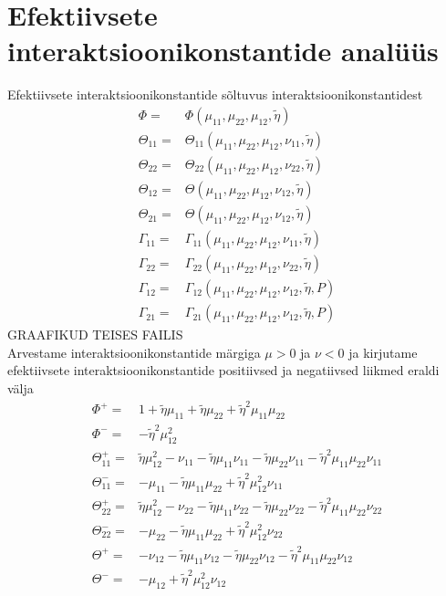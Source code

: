 \documentclass[class=article, crop=false]{standalone}
\begin{document}
\section{Efektiivsete interaktsioonikonstantide analüüs}
Efektiivsete interaktsioonikonstantide sõltuvus interaktsioonikonstantidest
\begin{equation}\label{key}
	\begin{split}
		\Phi = & \Phi ( \mu_{11}, \mu_{22}, \mu_{12}, \tilde{ \eta}) \\
		\Theta_{11} = & \Theta_{11} ( \mu_{11}, \mu_{22}, \mu_{12}, \nu_{11}, \tilde{ \eta}) \\
		\Theta_{22} = & \Theta_{22} ( \mu_{11}, \mu_{22}, \mu_{12}, \nu_{22}, \tilde{ \eta}) \\
		\Theta_{12} = & \Theta ( \mu_{11}, \mu_{22}, \mu_{12}, \nu_{12}, \tilde{ \eta}) \\
		\Theta_{21} = & \Theta ( \mu_{11}, \mu_{22}, \mu_{12}, \nu_{12}, \tilde{ \eta}) \\
		\Gamma_{11} = & \Gamma_{11} ( \mu_{11}, \mu_{22}, \mu_{12}, \nu_{11}, \tilde{ \eta}) \\
		\Gamma_{22} = & \Gamma_{22} ( \mu_{11}, \mu_{22}, \mu_{12}, \nu_{22}, \tilde{ \eta}) \\
		\Gamma_{12} = & \Gamma_{12} ( \mu_{11}, \mu_{22}, \mu_{12}, \nu_{12}, \tilde{ \eta}, P) \\
		\Gamma_{21} = & \Gamma_{21} ( \mu_{11}, \mu_{22}, \mu_{12}, \nu_{12}, \tilde{ \eta}, P)
	\end{split}
\end{equation}
GRAAFIKUD TEISES FAILIS\\
Arvestame interaktsioonikonstantide märgiga $ \mu > 0 $ ja $ \nu < 0 $ ja kirjutame efektiivsete interaktsioonikonstantide positiivsed ja negatiivsed liikmed eraldi välja
\begin{equation}\label{key}
	\begin{split}
		\Phi^{+} = & 1 + \tilde{ \eta} \mu_{11} + \tilde{ \eta} \mu_{22} + \tilde{ \eta}^{2} \mu_{11} \mu_{22} \\
		\Phi^{-} = & - \tilde{ \eta}^{2} \mu_{12}^{2} \\
		\Theta_{11}^{+} = & \tilde{ \eta} \mu_{12}^{2} - \nu_{11} - \tilde{ \eta} \mu_{11} \nu_{11} - \tilde{ \eta} \mu_{22} \nu_{11} - \tilde{ \eta}^{2} \mu_{11} \mu_{22} \nu_{11} \\
		\Theta_{11}^{-} = & - \mu_{11} - \tilde{ \eta} \mu_{11} \mu_{22} + \tilde{ \eta}^{2} \mu_{12}^{2} \nu_{11} \\
		\Theta_{22}^{+} = & \tilde{ \eta} \mu_{12}^{2} - \nu_{22} - \tilde{ \eta} \mu_{11} \nu_{22} - \tilde{ \eta} \mu_{22} \nu_{22} - \tilde{ \eta}^{2} \mu_{11} \mu_{22} \nu_{22} \\
		\Theta_{22}^{-} = & - \mu_{22} - \tilde{ \eta} \mu_{11} \mu_{22}+ \tilde{ \eta}^{2} \mu_{12}^{2} \nu_{22} \\
		\Theta^{+} = & - \nu_{12} - \tilde{ \eta} \mu_{11} \nu_{12} - \tilde{ \eta} \mu_{22} \nu_{12} - \tilde{ \eta}^{2} \mu_{11} \mu_{22} \nu_{12} \\
		\Theta^{-} = & - \mu_{12} + \tilde{ \eta}^{2} \mu_{12}^{2} \nu_{12}
	\end{split}
\end{equation}
\end{document}
